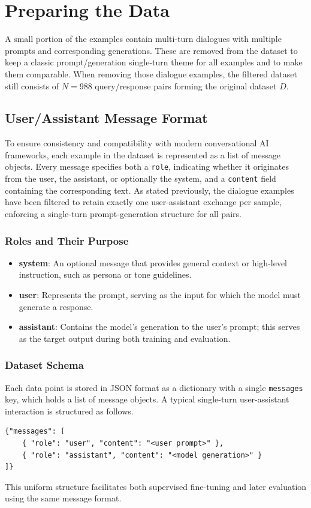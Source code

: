 \section{Preparing the Data}\label{sec:preparing_the_data}
A small portion of the examples contain multi-turn dialogues with multiple prompts and corresponding generations. These are removed from the dataset to keep a classic prompt/generation single-turn theme for all examples and to make them comparable. When removing those dialogue examples, the filtered dataset still consists of $N = 988$ query/response pairs forming the original dataset $D$.

\subsection{User/Assistant Message Format}\label{subsec:message_format}
To ensure consistency and compatibility with modern conversational AI frameworks, each example in the dataset is represented as a list of message objects. Every message specifies both a \texttt{role}, indicating whether it originates from the user, the assistant, or optionally the system, and a \texttt{content} field containing the corresponding text. As stated previously, the dialogue examples have been filtered to retain exactly one user-assistant exchange per sample, enforcing a single-turn prompt-generation structure for all pairs.

\subsubsection{Roles and Their Purpose}
\begin{itemize}
\item \textbf{system}: An optional message that provides general context or high-level instruction, such as persona or tone guidelines.
\item \textbf{user}: Represents the prompt, serving as the input for which the model must generate a response.
\item \textbf{assistant}: Contains the model's generation to the user's prompt; this serves as the target output during both training and evaluation.
\end{itemize}

\subsubsection{Dataset Schema}
Each data point is stored in JSON format as a dictionary with a single \texttt{messages} key, which holds a list of message objects. A typical single-turn user-assistant interaction is structured as follows.
\begin{lstlisting}[caption={User–assistant message pair}]
{"messages": [
    { "role": "user", "content": "<user prompt>" },
    { "role": "assistant", "content": "<model generation>" }
]}
\end{lstlisting}
This uniform structure facilitates both supervised fine-tuning and later evaluation using the same message format.

